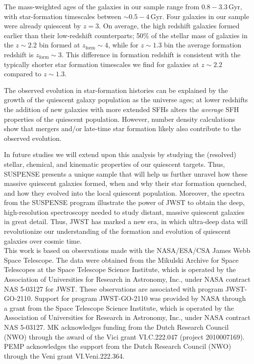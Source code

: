 \documentclass[twocolumn, astrosymb]{aastex631}
\begin{document}
The mass-weighted ages of the galaxies in our sample range from $0.8-3.3$\,Gyr, with star-formation timescales between $\sim0.5-4$\,Gyr. Four galaxies in our sample were already quiescent by $z = 3$.
On average, the high redshift galaxies formed earlier than their low-redshift counterparts; 50\% of the stellar mass of galaxies in the $z\sim2.2$ bin formed at $z_{\text{form}} \sim 4$, while for $z\sim1.3$ bin the average formation redshift is $z_{\text{form}} \sim 3$. This difference in formation redshift is consistent with the typically shorter star formation timescales we find for galaxies at $z\sim2.2$ compared to $z\sim1.3$.

The observed evolution in star-formation histories can be explained by the growth of the quiescent galaxy population as the universe ages; at lower redshifts the addition of new galaxies with more extended SFHs alters the \textit{average} SFH properties of the quiescent population. However, number density calculations show that mergers and/or late-time star formation likely also contribute to the observed evolution. 

In future studies we will extend upon this analysis by studying the (resolved) stellar, chemical, and kinematic properties of our quiescent targets. Thus, SUSPENSE presents a unique sample that will help us further unravel how these massive quiescent galaxies formed, when and why their star formation quenched, and how they evolved into the local quiescent population. Moreover, the spectra from the SUSPENSE program illustrate the power of JWST to obtain the deep, high-resolution spectroscopy needed to study distant, massive quiescent galaxies in great detail. Thus, JWST has marked a new era, in which ultra-deep data will revolutionize our understanding of the formation and evolution of quiescent galaxies over cosmic time. \\

This work is based on observations made with the NASA/ESA/CSA James Webb Space Telescope. The data were obtained from the Mikulski Archive for Space Telescopes at the Space Telescope Science Institute, which is operated by the Association of Universities for Research in Astronomy, Inc., under NASA contract NAS 5-03127 for JWST. These observations are associated with program JWST-GO-2110. Support for program JWST-GO-2110 was provided by NASA through a grant from the Space Telescope Science Institute, which is operated by the Association of Universities for Research in Astronomy, Inc., under NASA contract NAS 5-03127. MK acknowledges funding from the Dutch Research Council (NWO) through the award of the Vici grant VI.C.222.047 (project 2010007169). PEMP acknowledges the support from the Dutch Research Council (NWO) through the Veni grant VI.Veni.222.364.
\end{document}
